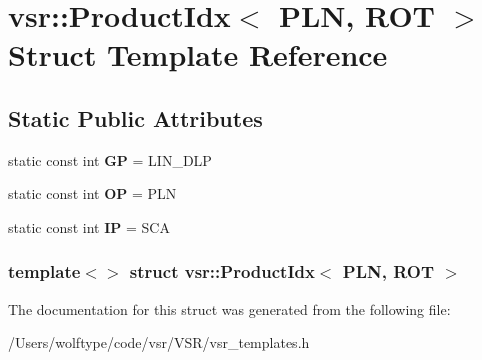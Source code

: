 \hypertarget{structvsr_1_1_product_idx_3_01_p_l_n_00_01_r_o_t_01_4}{\section{vsr\-:\-:Product\-Idx$<$ P\-L\-N, R\-O\-T $>$ Struct Template Reference}
\label{structvsr_1_1_product_idx_3_01_p_l_n_00_01_r_o_t_01_4}
}
\subsection*{Static Public Attributes}
\begin{DoxyCompactItemize}
\item 
\hypertarget{structvsr_1_1_product_idx_3_01_p_l_n_00_01_r_o_t_01_4_a2d5ca9b9ea217ffedf8915f2033eb532}{static const int {\bfseries G\-P} = L\-I\-N\-\_\-\-D\-L\-P}\label{structvsr_1_1_product_idx_3_01_p_l_n_00_01_r_o_t_01_4_a2d5ca9b9ea217ffedf8915f2033eb532}

\item 
\hypertarget{structvsr_1_1_product_idx_3_01_p_l_n_00_01_r_o_t_01_4_aa4f0f03d27f667ad9f15d3306071e7a4}{static const int {\bfseries O\-P} = P\-L\-N}\label{structvsr_1_1_product_idx_3_01_p_l_n_00_01_r_o_t_01_4_aa4f0f03d27f667ad9f15d3306071e7a4}

\item 
\hypertarget{structvsr_1_1_product_idx_3_01_p_l_n_00_01_r_o_t_01_4_af3b5311f18df6007046356581abd3dc2}{static const int {\bfseries I\-P} = S\-C\-A}\label{structvsr_1_1_product_idx_3_01_p_l_n_00_01_r_o_t_01_4_af3b5311f18df6007046356581abd3dc2}

\end{DoxyCompactItemize}
\subsubsection*{template$<$$>$ struct vsr\-::\-Product\-Idx$<$ P\-L\-N, R\-O\-T $>$}



The documentation for this struct was generated from the following file\-:\begin{DoxyCompactItemize}
\item 
/\-Users/wolftype/code/vsr/\-V\-S\-R/vsr\-\_\-templates.\-h\end{DoxyCompactItemize}
